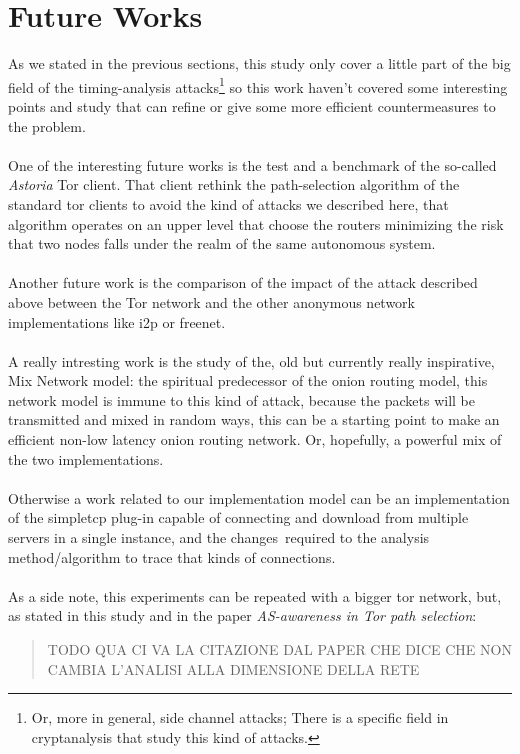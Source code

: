 \section{Future Works}

As we stated in the previous sections, this study only cover a little part of
the big field of the timing-analysis attacks\footnote{Or, more in general, side
channel attacks; There is a specific field in cryptanalysis that study this kind
of attacks.} so this work haven't covered some interesting points and study that
can refine or give some more efficient countermeasures to the problem.
\\\\
One of the interesting future works is the test and a benchmark
of the so-called \emph{Astoria}\cite{starov2015measuring} Tor client.
That client rethink
the path-selection algorithm of the standard tor clients to avoid the kind of
attacks we described here, that algorithm operates on an upper level that choose
the routers minimizing the risk that two nodes falls under the realm of the same
autonomous system.
\\\\
Another future work is the comparison of the impact of the attack described above
between the Tor network and the other anonymous network implementations like i2p or freenet.
\\\\
A really intresting work is the study of the, old but currently really inspirative,
Mix Network model\cite{chaum1981untraceable}: the spiritual predecessor
of the onion routing model, this network model is immune to this kind of
attack, because the packets will be transmitted and mixed in random ways,
this can be a starting point to make an efficient non-low latency onion routing
network. Or, hopefully, a powerful mix of the two implementations.
\\\\
Otherwise a work related to our implementation model can be an implementation
of the simpletcp plug-in capable of connecting and download from multiple servers
in a single instance, and the changes\
required to the analysis method/algorithm to trace that kinds of connections.
\\\\
As a side note, this experiments can be repeated with a bigger tor
network, but, as stated in this study and in the paper \emph{AS-awareness in Tor
path selection}\cite{edman2009awareness}:\\
\begin{quote}
TODO QUA CI VA LA CITAZIONE DAL PAPER CHE DICE CHE NON CAMBIA L'ANALISI ALLA DIMENSIONE
DELLA RETE
\end{quote}

